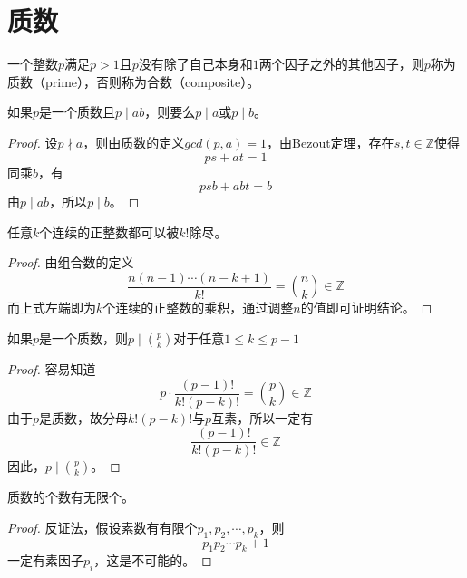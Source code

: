 \section{质数}
\begin{definition}
	一个整数$p$满足$p>1$且$p$没有除了自己本身和$1$两个因子之外的其他因子，则$p$称为质数（prime），否则称为合数（composite）。
\end{definition}
\begin{theorem}[欧几里得第一定理]
	如果$p$是一个质数且$p\mid ab$，则要么$p\mid a$或$p\mid b$。
\end{theorem}
\begin{proof}
	设$p\nmid a$，则由质数的定义$gcd(p, a) = 1$，由Bezout定理，存在$s, t\in \mathbb{Z}$使得
	\begin{equation*}
		ps + at = 1
	\end{equation*}
	同乘$b$，有
	\begin{equation*}
		psb + abt = b
	\end{equation*}
	由$p\mid ab$，所以$p\mid b$。
\end{proof}
\begin{theorem}
	任意$k$个连续的正整数都可以被$k!$除尽。
\end{theorem}
\begin{proof}
	由组合数的定义
	\begin{equation*}
		\frac{n(n-1)\cdots(n-k+1)}{k!} = \binom{n}{k}\in\mathbb{Z}
	\end{equation*}
	而上式左端即为$k$个连续的正整数的乘积，通过调整$n$的值即可证明结论。
\end{proof}
\begin{corollary}
	如果$p$是一个质数，则$p\mid \binom{p}{k}$对于任意$1\leq k\leq p-1$
\end{corollary}
\begin{proof}
	容易知道
	\begin{equation*}
		p\cdot \frac{(p-1)!}{k!(p-k)!} = \binom{p}{k} \in \mathbb{Z}
	\end{equation*}
	由于$p$是质数，故分母$k!(p-k)!$与$p$互素，所以一定有
	\begin{equation*}
		\frac{(p-1)!}{k!(p-k)!}\in\mathbb{Z}
	\end{equation*}
	因此，$p\mid \binom{p}{k}$。
\end{proof}
\begin{theorem}[欧几里得第二定理]
	质数的个数有无限个。
\end{theorem}
\begin{proof}
	反证法，假设素数有有限个$p_1, p_2, \cdots,p_k$，则
	\begin{equation*}
		p_1p_2\cdots p_k +1
	\end{equation*}
	一定有素因子$p_i$，这是不可能的。
\end{proof}

